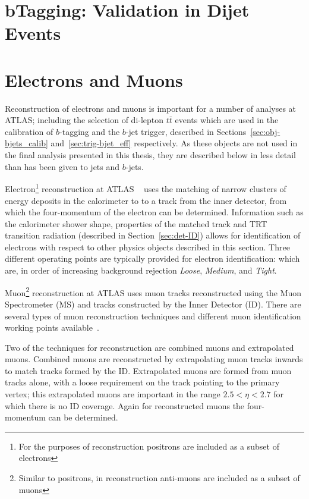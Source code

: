 \section{bTagging: Validation in Dijet Events}

\newpage
\section{Electrons and Muons}
\label{sec:obj-leptons}

Reconstruction of electrons and muons
is important for a number of analyses at ATLAS;
including the selection of di-lepton $t\bar{t}$ events
which are used in the calibration of $b$-tagging and the $b$-jet trigger,
described in Sections~\ref{sec:obj-bjets_calib} and~\ref{sec:trig-bjet_eff} respectively.
As these objects are not used in the final analysis presented in this thesis,
they are described below in less detail than has been given to jets and $b$-jets.

Electron\footnote{For the purposes of reconstruction positrons are included as a subset of electrons}
reconstruction at ATLAS ~\cite{obj-electrons} uses
the matching of narrow clusters of energy deposits in the calorimeter to
to a track from the inner detector,
from which the four-momentum of the electron can be determined.
Information such as the calorimeter shower shape,
properties of the matched track
and TRT transition radiation (described in Section~\ref{sec:det-ID})
allows for identification of electrons with respect to other physics objects described in this section.
Three different operating points are typically provided for electron identification:
which are, in order of increasing background rejection
\textit{Loose}, \textit{Medium}, and \textit{Tight}. 

Muon\footnote{Similar to positrons, in reconstruction anti-muons are included as a subset of muons}
reconstruction at ATLAS  uses muon tracks reconstructed using the Muon Spectrometer (MS) and tracks constructed by the Inner Detector (ID).
There are several types of muon reconstruction techniques
and different muon identification working points available~\cite{obj-muons}.

Two of the techniques for reconstruction are combined muons and extrapolated muons.
Combined muons are reconstructed by extrapolating muon tracks inwards to match tracks formed by the ID.
Extrapolated muons are formed from muon tracks alone,
with a loose requirement on the track pointing to the primary vertex;
this extrapolated muons are important in the range $2.5 < \eta < 2.7$ for which there is no ID coverage.
Again for reconstructed muons the four-momentum can be determined.

